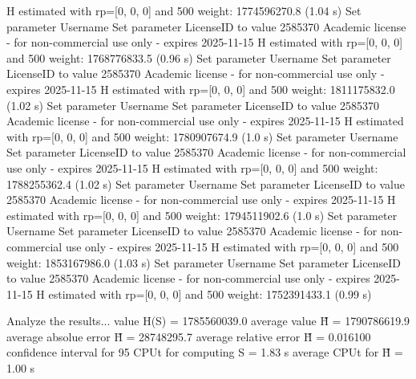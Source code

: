   H estimated with rp=[0, 0, 0] and 500 weight:  1774596270.8  (1.04 s)
Set parameter Username
Set parameter LicenseID to value 2585370
Academic license - for non-commercial use only - expires 2025-11-15
  H estimated with rp=[0, 0, 0] and 500 weight:  1768776833.5  (0.96 s)
Set parameter Username
Set parameter LicenseID to value 2585370
Academic license - for non-commercial use only - expires 2025-11-15
  H estimated with rp=[0, 0, 0] and 500 weight:  1811175832.0  (1.02 s)
Set parameter Username
Set parameter LicenseID to value 2585370
Academic license - for non-commercial use only - expires 2025-11-15
  H estimated with rp=[0, 0, 0] and 500 weight:  1780907674.9  (1.0 s)
Set parameter Username
Set parameter LicenseID to value 2585370
Academic license - for non-commercial use only - expires 2025-11-15
  H estimated with rp=[0, 0, 0] and 500 weight:  1788255362.4  (1.02 s)
Set parameter Username
Set parameter LicenseID to value 2585370
Academic license - for non-commercial use only - expires 2025-11-15
  H estimated with rp=[0, 0, 0] and 500 weight:  1794511902.6  (1.0 s)
Set parameter Username
Set parameter LicenseID to value 2585370
Academic license - for non-commercial use only - expires 2025-11-15
  H estimated with rp=[0, 0, 0] and 500 weight:  1853167986.0  (1.03 s)
Set parameter Username
Set parameter LicenseID to value 2585370
Academic license - for non-commercial use only - expires 2025-11-15
  H estimated with rp=[0, 0, 0] and 500 weight:  1752391433.1  (0.99 s)

Analyze the results...
  value H(S)                  = 1785560039.0 
  average value H̃             = 1790786619.9 
  average absolue error H̃     = 28748295.7 
  average relative error H̃    = 0.016100 
  confidence interval for 95%
  CPUt for computing S         = 1.83 s
  average CPUt for H̃           = 1.00 s

